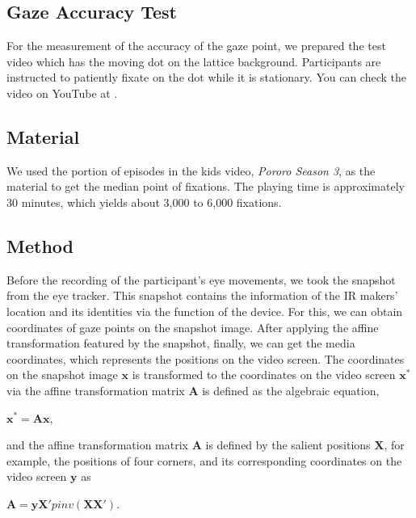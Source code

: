 \documentclass{article}
\begin{document}
\subsection{Gaze Accuracy Test}
For the measurement of the accuracy of the gaze point, we prepared the test video which has the moving dot on the lattice background. Participants are instructed to patiently fixate on the dot while it is stationary. You can check the video on YouTube at \citet{GAT}.

\subsection{Material}
We used the portion of episodes in the kids video, \textit{Pororo Season 3}, as the material to get the median point of fixations. The playing time is approximately 30 minutes, which yields about 3,000 to 6,000 fixations.

\subsection{Method}
Before the recording of the participant's eye movements, we took the snapshot from the eye tracker. This snapshot contains the information of the IR makers' location and its identities via the function of the device. For this, we can obtain coordinates of gaze points on the snapshot image. After applying the affine transformation featured by the snapshot, finally, we can get the media coordinates, which represents the positions on the video screen. The coordinates on the snapshot image $\mathbf{x}$ is transformed to the coordinates on the video screen $\mathbf{x^\ast}$ via the affine transformation matrix $\mathbf{A}$ is defined as the algebraic equation, 

\begin{center}
$\mathbf{x^\ast} = \mathbf{Ax},$\\
\end{center}

and the affine transformation matrix $\mathbf{A}$ is defined by the salient positions $\mathbf{X}$, for example, the positions of four corners, and its corresponding coordinates on the video screen $\mathbf{y}$ as

\begin{center}
$\mathbf{A} = \mathbf{yX'}pinv(\mathbf{XX'})$.
\end{center}



\end{document}
